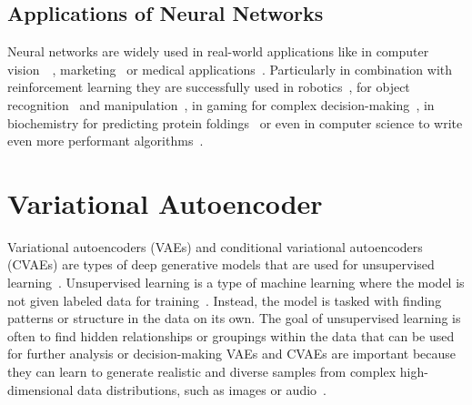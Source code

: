 \subsection{Applications of Neural Networks}


Neural networks are widely used in real-world applications like in computer vision~\cite{VGG16}~\cite{ResNet50}, marketing~\cite{DL_Targeting} or medical applications~\cite{DL_medical}. Particularly in combination with reinforcement learning they are successfully used in robotics~\cite{RL_robotics}, for object recognition~\cite{DL_object_recognition} and manipulation~\cite{RL_object_manipulation}, in gaming for complex decision-making~\cite{SAC_VideoGames_Paper}, in biochemistry for predicting protein foldings~\cite{AlphaFold} or even in computer science to write even more performant algorithms~\cite{AlphaCode}.

% 

\section{Variational Autoencoder}

Variational autoencoders (VAEs) and conditional variational autoencoders (CVAEs) are types of deep generative models that are used for unsupervised learning~\cite{pml2Book}. Unsupervised learning is a type of machine learning where the model is not given labeled data for training~\cite{pml1Book}. Instead, the model is tasked with finding patterns or structure in the data on its own. The goal of unsupervised learning is often to find hidden relationships or groupings within the data that can be used for further analysis or decision-making
VAEs and CVAEs are important because they can learn to generate realistic and diverse samples from complex high-dimensional data distributions, such as images or audio~\cite{VAE}.

